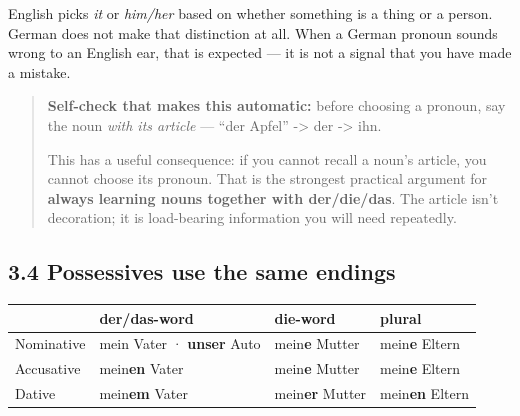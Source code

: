 \documentclass[
  11pt,
]{article}
\newcounter{none} %
\begin{document}
English picks \emph{it} or \emph{him/her} based on whether something is
a thing or a person. German does not make that distinction at all. When
a German pronoun sounds wrong to an English ear, that is expected --- it
is not a signal that you have made a mistake.

\begin{quote}
\textbf{Self-check that makes this automatic:} before choosing a
pronoun, say the noun \emph{with its article} --- ``der Apfel''
-\textgreater{} der -\textgreater{} ihn.

This has a useful consequence: if you cannot recall a noun's article,
you cannot choose its pronoun. That is the strongest practical argument
for \textbf{always learning nouns together with der/die/das}. The
article isn't decoration; it is load-bearing information you will need
repeatedly.
\end{quote}

\subsection{3.4 Possessives use the same
endings}\label{possessives-use-the-same-endings}

{\def\LTcaptype{none} %
\begin{longtable}[]{@{}
  >{\raggedright\arraybackslash}p{}
  >{\raggedright\arraybackslash}p{}
  >{\raggedright\arraybackslash}p{}
  >{\raggedright\arraybackslash}p{}@{}}
\toprule\noalign{}
\begin{minipage}[b]{\linewidth}\raggedright
\end{minipage} & \begin{minipage}[b]{\linewidth}\raggedright
der/das-word
\end{minipage} & \begin{minipage}[b]{\linewidth}\raggedright
die-word
\end{minipage} & \begin{minipage}[b]{\linewidth}\raggedright
plural
\end{minipage} \\
\midrule\noalign{}
\endhead
\bottomrule\noalign{}
\endlastfoot
Nominative & mein Vater · \textbf{unser} Auto & mein\textbf{e} Mutter &
mein\textbf{e} Eltern \\
Accusative & mein\textbf{en} Vater & mein\textbf{e} Mutter &
mein\textbf{e} Eltern \\
Dative & mein\textbf{em} Vater & mein\textbf{er} Mutter &
mein\textbf{en} Eltern \\
\end{longtable}
}
\end{document}
